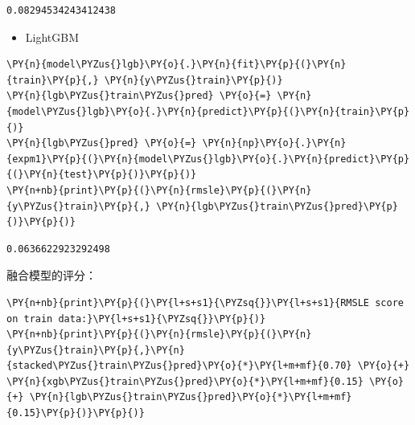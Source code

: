 \documentclass[no-math]{YangThesis}
\begin{document}
\begin{Verbatim}[commandchars=\\\{\}]
0.08294534243412438
\end{Verbatim}

\begin{itemize}
	\tightlist
	\item
	LightGBM
\end{itemize}

\begin{tcolorbox}[breakable, size=fbox, boxrule=1pt, pad at break*=1mm,colback=cellbackground, colframe=cellborder]
	\begin{Verbatim}[commandchars=\\\{\}]
\PY{n}{model\PYZus{}lgb}\PY{o}{.}\PY{n}{fit}\PY{p}{(}\PY{n}{train}\PY{p}{,} \PY{n}{y\PYZus{}train}\PY{p}{)}
\PY{n}{lgb\PYZus{}train\PYZus{}pred} \PY{o}{=} \PY{n}{model\PYZus{}lgb}\PY{o}{.}\PY{n}{predict}\PY{p}{(}\PY{n}{train}\PY{p}{)}
\PY{n}{lgb\PYZus{}pred} \PY{o}{=} \PY{n}{np}\PY{o}{.}\PY{n}{expm1}\PY{p}{(}\PY{n}{model\PYZus{}lgb}\PY{o}{.}\PY{n}{predict}\PY{p}{(}\PY{n}{test}\PY{p}{)}\PY{p}{)}
\PY{n+nb}{print}\PY{p}{(}\PY{n}{rmsle}\PY{p}{(}\PY{n}{y\PYZus{}train}\PY{p}{,} \PY{n}{lgb\PYZus{}train\PYZus{}pred}\PY{p}{)}\PY{p}{)}
	\end{Verbatim}
\end{tcolorbox}

\begin{Verbatim}[commandchars=\\\{\}]
0.0636622923292498
\end{Verbatim}

融合模型的评分：

\begin{tcolorbox}[breakable, size=fbox, boxrule=1pt, pad at break*=1mm,colback=cellbackground, colframe=cellborder]
	\begin{Verbatim}[commandchars=\\\{\}]
\PY{n+nb}{print}\PY{p}{(}\PY{l+s+s1}{\PYZsq{}}\PY{l+s+s1}{RMSLE score on train data:}\PY{l+s+s1}{\PYZsq{}}\PY{p}{)}
\PY{n+nb}{print}\PY{p}{(}\PY{n}{rmsle}\PY{p}{(}\PY{n}{y\PYZus{}train}\PY{p}{,}\PY{n}{stacked\PYZus{}train\PYZus{}pred}\PY{o}{*}\PY{l+m+mf}{0.70} \PY{o}{+} \PY{n}{xgb\PYZus{}train\PYZus{}pred}\PY{o}{*}\PY{l+m+mf}{0.15} \PY{o}{+} \PY{n}{lgb\PYZus{}train\PYZus{}pred}\PY{o}{*}\PY{l+m+mf}{0.15}\PY{p}{)}\PY{p}{)}
	\end{Verbatim}
\end{tcolorbox}
\end{document}
